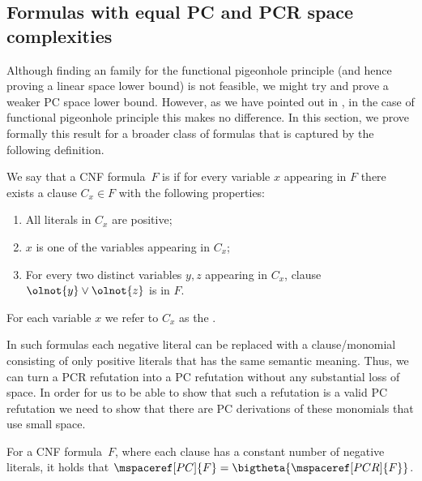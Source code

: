 \documentclass{toc}
\begin{document}
\subsection{Formulas with equal PC and PCR space complexities}
\label{sec:varweightconstrained}


Although finding an \kextendible{} family for the functional
pigeonhole principle (and hence proving a linear space lower bound) is not
feasible, we might try and prove a weaker PC space lower
bound. However, as we have pointed out in
, in the case of functional pigeonhole
principle this makes no difference. In this section, we prove formally
this result for a broader class of formulas that is captured by the
following definition.

\begin{definition}\label{def:var-weight-constrained}
  We say that a CNF formula~$F$ is
  \introduceterm{\varweightconstrained{}} if for every variable $x$
  appearing in $F$ there exists a clause $C_x \in F$ with the
  following properties:
  \begin{enumerate}
  \item All literals in $C_x$ are positive;
  \item $x$ is one of the variables appearing in $C_x$;
  \item For every two distinct variables $y, z$ appearing in $C_x$,
    clause $\olnot{y} \lor \olnot{z}$ is in $F$.
  \end{enumerate}
  For each variable $x$ we refer to $C_x$ as the
  .
\end{definition}

In such formulas each negative literal can be replaced with a
clause/monomial consisting of only positive literals that has the same
semantic meaning. Thus, we can turn a PCR refutation into a PC
refutation without any substantial loss of space. In order for us to
be able to show that such a refutation is a valid PC refutation we
need to show that there are PC derivations of these monomials that use
small space.

\begin{theorem}\label{th:varweightconstrained}
  For a \varweightconstrained{} CNF formula~$F$, where each clause has
  a constant number of negative literals, it holds that
  $\mspaceref[PC]{F} = \bigtheta{\mspaceref[PCR]{F}}$.
\end{theorem}

%
\end{document}
